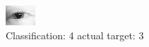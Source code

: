 \begin{figure}[h!]
\begin{center}
\includegraphics[width=0.60\columnwidth]{figures/ID60_class_4_target_3.png}
\end{center}
\caption{ Classification: 4 actual target: 3}
\label{fig:ID60_class_4_target_3}
\end{figure}
